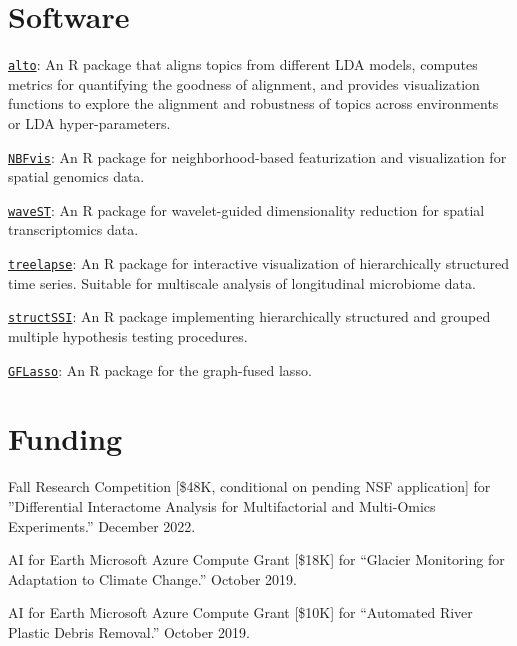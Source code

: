 \documentclass[letterpaper]{article}
\renewenvironment{itemize}{
  \begin{list}{}{
    \setlength{\leftmargin}{1.5em}
  }
}{
  \end{list}
}
\begin{document}
\section*{Software}

\begin{itemize}
\item \href{https://lasy.github.io/alto/}{\texttt{alto}}: An R package that
aligns topics from different LDA models, computes metrics for quantifying the
goodness of alignment, and provides visualization functions to explore the
alignment and robustness of topics across environments or LDA hyper-parameters.
\item \href{https://github.com/XTH1114/NBFvis}{\texttt{NBFvis}}: An R package for neighborhood-based featurization and
visualization for spatial genomics data.
\item \href{https://github.com/OliverXUZY/waveST/}{\texttt{waveST}}: An R
package for wavelet-guided dimensionality reduction for spatial transcriptomics
data.
\item \href{https://krisrs1128.github.io/treelapse/}{\texttt{treelapse}}: An R
package for interactive visualization of hierarchically structured time series.
Suitable for multiscale analysis of longitudinal microbiome data.
\item \href{https://github.com/krisrs1128/structSSI}{\texttt{structSSI}}: An R
package implementing hierarchically structured and grouped multiple hypothesis
testing procedures.
\item \href{https://github.com/krisrs1128/GFLasso}{\texttt{GFLasso}}: An R
package for the graph-fused lasso.
\end{itemize}

\section*{Funding}

\begin{itemize}
\item Fall Research Competition [\$48K, conditional on pending NSF application]
for ''Differential Interactome Analysis for Multifactorial and Multi-Omics
Experiments.'' December 2022.
\item AI for Earth Microsoft Azure Compute Grant [\$18K] for
``Glacier Monitoring for Adaptation to Climate Change.'' October 2019. \\
\item AI for Earth Microsoft Azure Compute Grant [\$10K] for
``Automated River Plastic Debris Removal.'' October 2019.
\end{itemize}
\end{document}
